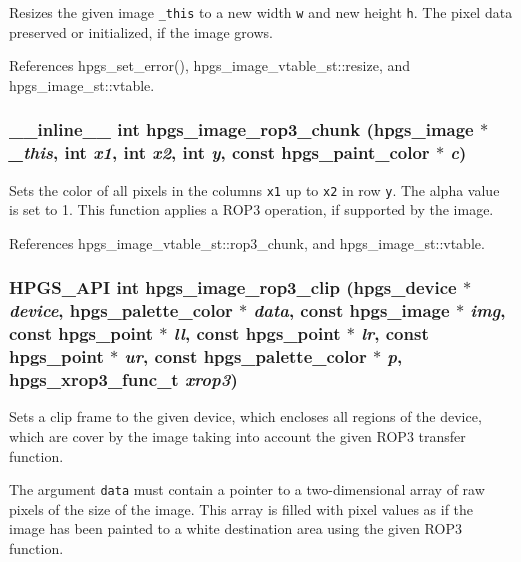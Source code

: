 Resizes the given image {\tt \_\-this} to a new width {\tt w} and new height {\tt h}. The pixel data preserved or initialized, if the image grows. 

References hpgs\_\-set\_\-error(), hpgs\_\-image\_\-vtable\_\-st::resize, and hpgs\_\-image\_\-st::vtable.
\subsubsection[hpgs\_\-image\_\-rop3\_\-chunk]{\setlength{\rightskip}{0pt plus 5cm}\_\-\_\-inline\_\-\_\- int hpgs\_\-image\_\-rop3\_\-chunk ({\bf hpgs\_\-image} $\ast$ {\em \_\-this}, \/  int {\em x1}, \/  int {\em x2}, \/  int {\em y}, \/  const {\bf hpgs\_\-paint\_\-color} $\ast$ {\em c})\hspace{0.3cm}{\tt  [static]}}\label{group__image_gfa793929911f17d232d6936bf64f1a3a}


Sets the color of all pixels in the columns {\tt x1} up to {\tt x2} in row {\tt y}. The alpha value is set to 1. This function applies a ROP3 operation, if supported by the image. 

References hpgs\_\-image\_\-vtable\_\-st::rop3\_\-chunk, and hpgs\_\-image\_\-st::vtable.
\subsubsection[hpgs\_\-image\_\-rop3\_\-clip]{\setlength{\rightskip}{0pt plus 5cm}HPGS\_\-API int hpgs\_\-image\_\-rop3\_\-clip ({\bf hpgs\_\-device} $\ast$ {\em device}, \/  {\bf hpgs\_\-palette\_\-color} $\ast$ {\em data}, \/  const {\bf hpgs\_\-image} $\ast$ {\em img}, \/  const {\bf hpgs\_\-point} $\ast$ {\em ll}, \/  const {\bf hpgs\_\-point} $\ast$ {\em lr}, \/  const {\bf hpgs\_\-point} $\ast$ {\em ur}, \/  const {\bf hpgs\_\-palette\_\-color} $\ast$ {\em p}, \/  hpgs\_\-xrop3\_\-func\_\-t {\em xrop3})}\label{group__image_g31be12e9a8d10fa5c07bcd43a830b77b}


Sets a clip frame to the given device, which encloses all regions of the device, which are cover by the image taking into account the given ROP3 transfer function.

The argument {\tt data} must contain a pointer to a two-dimensional array of raw pixels of the size of the image. This array is filled with pixel values as if the image has been painted to a white destination area using the given ROP3 function.

